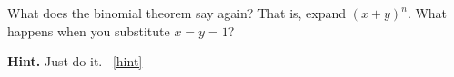 \documentclass{book}
\begin{document}
\setcounter{project}{79}
\addtocounter{project}{-1}
\begin{activity}[]\label{act-pascalrowsum-binom}
\hypertarget{p-615}{}%
What does the binomial theorem say again?  That is, expand \((x+y)^n\).  What happens when you substitute \(x = y = 1\)?%
\par\smallskip%
\noindent\textbf{Hint.}\hypertarget{hint-36}{}\quad%
\hypertarget{p-616}{}%
Just do it.%
~\hfill{\tiny\hyperlink{a-79}{[hint]}\hypertarget{q-79}{}}\end{activity}
\end{document}
